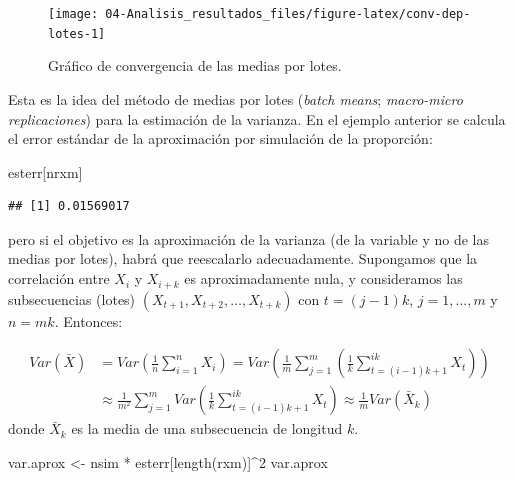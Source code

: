 \documentclass[
]{book}
\newenvironment{Shaded}{\begin{snugshade}}{\end{snugshade}}
\newcommand{\DecValTok}[1]{\textcolor[rgb]{0.00,0.00,0.81}{#1}}
\newcommand{\FunctionTok}[1]{\textcolor[rgb]{0.00,0.00,0.00}{#1}}
\newcommand{\NormalTok}[1]{#1}
\newcommand{\OtherTok}[1]{\textcolor[rgb]{0.56,0.35,0.01}{#1}}
\newcommand{\SpecialCharTok}[1]{\textcolor[rgb]{0.00,0.00,0.00}{#1}}
\theoremstyle{break}
\theoremstyle{definition}
\theoremstyle{definition}
\theoremstyle{definition}
\theoremstyle{definition}
\theoremstyle{remark}
\begin{document}
\begin{figure}[!htb]

{\centering \texttt{[image: 04-Analisis\_resultados\_files/figure-latex/conv-dep-lotes-1]} 

}

\caption{Gráfico de convergencia de las medias por lotes.}\label{fig:conv-dep-lotes}
\end{figure}

Esta es la idea del método de medias por lotes
(\emph{batch means}; \emph{macro-micro replicaciones}) para la estimación de la varianza.
En el ejemplo anterior se calcula el error estándar de la aproximación por simulación de la proporción:

\begin{Shaded}
\begin{Highlighting}[]
\NormalTok{esterr[nrxm]}
\end{Highlighting}
\end{Shaded}

\begin{verbatim}
## [1] 0.01569017
\end{verbatim}

pero si el objetivo es la aproximación de la varianza (de la variable y no de las medias por lotes), habrá que reescalarlo adecuadamente.
Supongamos que la correlación entre \(X_i\) y \(X_{i+k}\) es aproximadamente nula,
y consideramos las subsecuencias (lotes) \((X_{t+1},X_{t+2},\ldots,X_{t+k})\) con \(t=(j-1)k\), \(j=1,\ldots,m\) y \(n = mk\).
Entonces:

\[\begin{aligned}
Var \left(\bar X \right) &= Var \left(\frac{1}{n} \sum_{i=1}^n X_i\right) 
= Var \left( \frac{1}{m}\sum_{j=1}^m \left(\frac{1}{k} \sum_{t=(i-1)k + 1}^{ik} X_t\right) \right) \\
&\approx \frac{1}{m^2} \sum_{j=1}^m Var \left(\frac{1}{k} \sum_{t=(i-1)k + 1}^{ik} X_t\right)
\approx \frac{1}{m} Var \left(\bar{X}_k \right)
\end{aligned}\]
donde \(\bar{X}_k\) es la media de una subsecuencia de longitud \(k\).

\begin{Shaded}
\begin{Highlighting}[]
\NormalTok{var.aprox }\OtherTok{\textless{}{-}}\NormalTok{ nsim }\SpecialCharTok{*}\NormalTok{ esterr[}\FunctionTok{length}\NormalTok{(rxm)]}\SpecialCharTok{\^{}}\DecValTok{2}
\NormalTok{var.aprox}
\end{Highlighting}
\end{Shaded}
\end{document}
